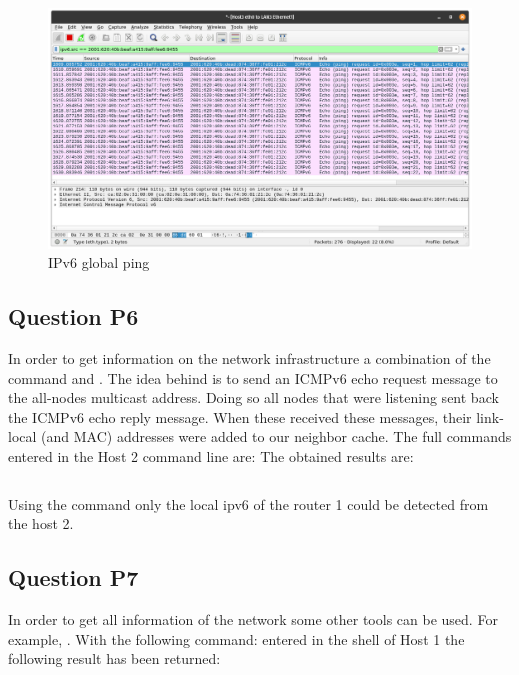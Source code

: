 \begin{figure}[H]
	\centering
	\includegraphics[width=0.8\linewidth]{images/P5_H1_to_H5.png}
	\caption{IPv6 global ping}
	\label{fig:ping_H1_H3}
\end{figure}

\subsection{Question P6}
In order to get information on the network infrastructure a combination of the command  and . The idea behind is to send an ICMPv6 echo request message to the all-nodes multicast address. Doing so all nodes that were listening sent back the ICMPv6 echo reply message. When these received these messages, their link-local (and MAC) addresses were added to our neighbor cache.
The full commands entered in the Host 2 command line are:  
The obtained results are:

\inputminted{text}{files/P6_neighbor_cache.txt}
\label{log:ping6_neighboor}

Using the command  only the local ipv6 of the router 1 could be detected from the host 2.

\subsection{Question P7}

In order to get all information of the network some other tools can be used. For example, . With the following command:  
entered in the shell of Host 1 the following result has been returned:

